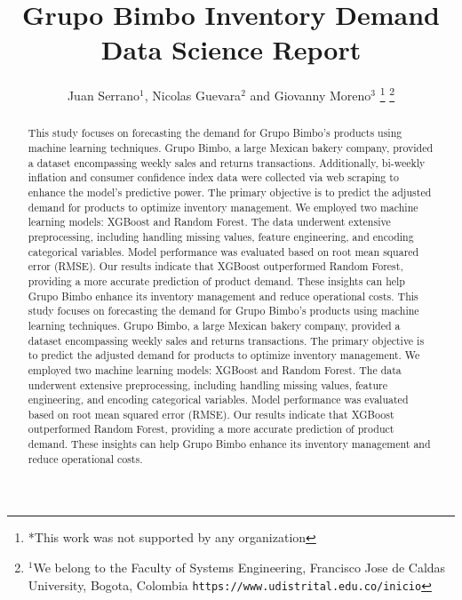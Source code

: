 \documentclass[letterpaper, 10 pt, conference]{ieeeconf}  %
\title{\LARGE \bf
Grupo Bimbo Inventory Demand Data Science Report}
\author{Juan Serrano$^{1}$, Nicolas Guevara$^{2}$ and Giovanny Moreno$^{3}$%
\thanks{*This work was not supported by any organization}%
\thanks{$^{1}$We belong to the Faculty of Systems Engineering, Francisco Jose de Caldas University, Bogota, Colombia
        {\tt\small https://www.udistrital.edu.co/inicio}}%
}
\begin{document}
\maketitle
\thispagestyle{empty}
\pagestyle{empty}


\begin{abstract}
This study focuses on forecasting the demand for Grupo Bimbo's products using machine learning techniques. Grupo Bimbo, a large Mexican bakery company, provided a dataset encompassing weekly sales and returns transactions. Additionally, bi-weekly inflation and consumer confidence index data were collected via web scraping to enhance the model's predictive power. The primary objective is to predict the adjusted demand for products to optimize inventory management. We employed two machine learning models: XGBoost and Random Forest. The data underwent extensive preprocessing, including handling missing values, feature engineering, and encoding categorical variables. Model performance was evaluated based on root mean squared error (RMSE). Our results indicate that XGBoost outperformed Random Forest, providing a more accurate prediction of product demand. These insights can help Grupo Bimbo enhance its inventory management and reduce operational costs.       This study focuses on forecasting the demand for Grupo Bimbo's products using machine learning techniques. Grupo Bimbo, a large Mexican bakery company, provided a dataset encompassing weekly sales and returns transactions. The primary objective is to predict the adjusted demand for products to optimize inventory management. We employed two machine learning models: XGBoost and Random Forest. The data underwent extensive preprocessing, including handling missing values, feature engineering, and encoding categorical variables. Model performance was evaluated based on root mean squared error (RMSE). Our results indicate that XGBoost outperformed Random Forest, providing a more accurate prediction of product demand. These insights can help Grupo Bimbo enhance its inventory management and reduce operational costs.
\end{abstract}


\end{document}
